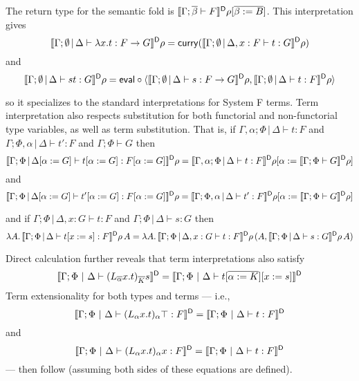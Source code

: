 \documentclass{lmcs}
\theoremstyle{plain}\newtheorem{satz}[thm]{Satz}
\begin{document}
The return type for the semantic fold is
  $\llbracket{\Gamma;\overline{\beta} \vdash F}\rrbracket^{\mathsf D}\rho[\overline{\beta := B}]$.
This interpretation gives
\[\llbracket{\Gamma;\emptyset \,|\, \Delta
    \vdash \lambda x.t : F \to G}\rrbracket^{\mathsf D}\rho = \mathsf{curry}
  (\llbracket{\Gamma;\emptyset \,|\, \Delta, x : F \vdash t :
  G}\rrbracket^{\mathsf D}\rho)\]
and
\[\llbracket{\Gamma;\emptyset \,|\, \Delta \vdash st:
    G}\rrbracket^{\mathsf D} \rho = \mathsf{eval} \circ \langle \llbracket{\Gamma;\emptyset \,|\, \Delta
  \vdash s: F \to G}\rrbracket^{\mathsf D}\rho, \llbracket{\Gamma;\emptyset \,|\, \Delta \vdash
  t: F}\rrbracket^{\mathsf D}\rho \rangle\]

\vspace*{0.05in}

\noindent
so it specializes to the standard interpretations for System F terms.
Term interpretation also respects substitution for both functorial and
non-functorial type variables, as well as term substitution. That is,
if $\Gamma,\alpha;\Phi \,|\, \Delta \vdash t : F$ and
$\Gamma;\Phi,\alpha \,|\, \Delta \vdash t' : F$ and $\Gamma;\Phi
\vdash G$ then
\[\llbracket{\Gamma;\Phi \,|\, \Delta[\alpha := G] \vdash t[\alpha :=
    G] : F[\alpha := G]}\rrbracket^{\mathsf D}\rho = \llbracket{\Gamma,\alpha;\Phi \,|\, \Delta
  \vdash t : F }\rrbracket^{\mathsf D}\rho [ \alpha := \llbracket{\Gamma;\Phi\vdash G}\rrbracket^{\mathsf D}\rho ]\]
and
\[\llbracket{\Gamma;\Phi \,|\, \Delta[\alpha := G] \vdash t'[\alpha :=
    G] : F[\alpha := G]}\rrbracket^{\mathsf D}\rho = \llbracket{\Gamma;\Phi,\alpha \,|\, \Delta
  \vdash t' : F }\rrbracket^{\mathsf D}\rho [ \alpha := \llbracket{\Gamma;\Phi\vdash G}\rrbracket^{\mathsf D}\rho ]\]

\vspace*{0.05in}

\noindent
and if $\Gamma;\Phi \,|\, \Delta, x: G \vdash t : F$ and $\Gamma;\Phi
\,|\, \Delta \vdash s : G$ then
\[\lambda A.\, \llbracket{\Gamma;\Phi \,|\, \Delta \vdash t[x := s] :
  F }\rrbracket^{\mathsf D}\rho \, A = \lambda A.\,\llbracket{\Gamma;\Phi \,|\, \Delta, x: G
  \vdash t : F}\rrbracket^{\mathsf D}\rho \,(A, \llbracket{\Gamma;\Phi \,|\, \Delta\vdash s:
  G}\rrbracket^{\mathsf D}\rho\, A)\]

\vspace*{0.05in}

\noindent
Direct calculation further reveals that term interpretations also
satisfy
\[\llbracket{\Gamma; \Phi~|~\Delta \vdash
  (L_{\overline{\alpha}}x.t)_{\overline{K}}s}\rrbracket^{\mathsf D} = \llbracket{\Gamma; \Phi~|~\Delta \vdash
  t [\overline{\alpha := K}][x := s]}\rrbracket^{\mathsf D}\] Term extensionality for both types
and terms --- i.e., \[\llbracket{\Gamma;\Phi~|~\Delta\vdash (L_\alpha x.t)_\alpha
  \top : F}\rrbracket^{\mathsf D} = \llbracket{\Gamma;\Phi~|~\Delta \vdash t : F}\rrbracket^{\mathsf D}\] and
\[\llbracket{\Gamma;\Phi~|~\Delta\vdash (L_\alpha x.t)_\alpha x : F}\rrbracket^{\mathsf D} =
\llbracket{\Gamma;\Phi~|~\Delta \vdash t : F}\rrbracket^{\mathsf D}\] --- then follow (assuming
both sides of these equations are defined).
\end{document}

